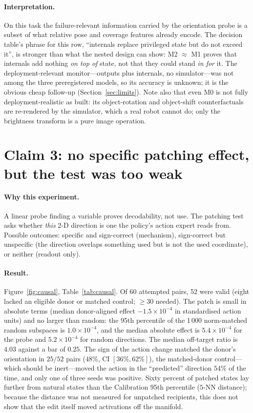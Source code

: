 \documentclass[11pt,a4paper]{article}
\newcommand{\Mz}{M0}\newcommand{\Mo}{M1}\newcommand{\Mt}{M2}
\begin{document}
\paragraph{Interpretation.} On this task the failure-relevant information carried by the orientation probe is a subset of what relative pose and coverage features already encode. The decision table's phrase for this row, ``internals replace privileged state but do not exceed it'', is stronger than what the nested design can show: \Mt{} $\approx$ \Mo{} proves that internals add nothing \emph{on top of} state, not that they could stand \emph{in for} it. The deployment-relevant monitor---outputs plus internals, no simulator---was not among the three preregistered models, so its accuracy is unknown; it is the obvious cheap follow-up (Section~\ref{sec:limits}). Note also that even \Mz{} is not fully deployment-realistic as built: its object-rotation and object-shift counterfactuals are re-rendered by the simulator, which a real robot cannot do; only the brightness transform is a pure image operation.

\section{Claim 3: no specific patching effect, but the test was too weak}
\label{sec:claim3}
\paragraph{Why this experiment.} A linear probe finding a variable proves decodability, not use. The patching test asks whether \emph{this} 2-D direction is one the policy's action expert reads from. Possible outcomes: specific and sign-correct (mechanism), sign-correct but unspecific (the direction overlaps something used but is not the used coordinate), or neither (readout only).

\paragraph{Result.} Figure~\ref{fig:causal}, Table~\ref{tab:causal}. Of 60 attempted pairs, 52 were valid (eight lacked an eligible donor or matched control; $\geq 30$ needed). The patch is small in absolute terms (median donor-aligned effect $-1.5\times 10^{-4}$ in standardised action units) and no larger than random: the 95th percentile of the 1\,000 norm-matched random subspaces is $1.0\times 10^{-4}$, and the median absolute effect is $5.4\times10^{-4}$ for the probe and $5.2\times10^{-4}$ for random directions. The median off-target ratio is $4.03$ against a bar of $0.25$. The sign of the action change matched the donor's orientation in $25/52$ pairs ($48\%$, CI $[36\%, 62\%]$), the matched-donor control---which should be inert---moved the action in the ``predicted'' direction $54\%$ of the time, and only one of three seeds was positive. Sixty percent of patched states lay further from natural states than the Calibration 95th percentile ($5$-NN distance); because the distance was not measured for unpatched recipients, this does not show that the edit itself moved activations off the manifold.
\end{document}
